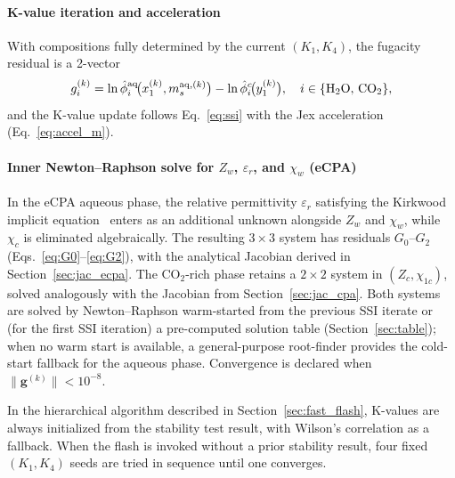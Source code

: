 \documentclass[preprint,12pt,authoryear]{elsarticle}
\begin{document}
\paragraph{K-value iteration and acceleration}
With compositions fully determined by the current $(K_1, K_4)$, the fugacity
residual is a 2-vector
\begin{equation}
  g_i^{(k)} =
    \ln\hat{\phi}_i^{\rm aq}\!\bigl(x_1^{(k)}, m_s^{{\rm aq},(k)}\bigr)
    - \ln\hat{\phi}_i^{c}\!\bigl(y_1^{(k)}\bigr),
    \quad i \in \{\mathrm{H}_2\mathrm{O},\,\mathrm{CO}_2\},
  \label{eq:g_kv}
\end{equation}
and the K-value update follows Eq.~\eqref{eq:ssi} with the Jex acceleration
(Eq.~\eqref{eq:accel_m}).
\paragraph{Inner Newton--Raphson solve for $Z_w$, $\varepsilon_r$, and $\chi_w$ (eCPA)}
In the eCPA aqueous phase, the relative permittivity $\varepsilon_r$ satisfying
the Kirkwood implicit equation~\citep{MaribMogensen2015} enters as an additional
unknown alongside $Z_w$ and $\chi_w$, while $\chi_c$ is eliminated algebraically.
The resulting $3\times 3$ system has residuals $G_0$--$G_2$
(Eqs.~\eqref{eq:G0}--\eqref{eq:G2}), with the analytical Jacobian derived in
Section~\ref{sec:jac_ecpa}.
The CO$_2$-rich phase retains a $2\times 2$ system in $(Z_c, \chi_{1c})$,
solved analogously with the Jacobian from Section~\ref{sec:jac_cpa}.
Both systems are solved by Newton--Raphson warm-started from the previous SSI
iterate or (for the first SSI iteration) a pre-computed solution table (Section~\ref{sec:table}); when no warm start is available, a general-purpose root-finder provides
the cold-start fallback for the aqueous phase.
Convergence is declared when $\|\mathbf{g}^{(k)}\| < 10^{-8}$.

In the hierarchical algorithm described in Section~\ref{sec:fast_flash},
K-values are always initialized from the stability test result, with
Wilson's correlation as a fallback.
When the flash is invoked without a prior stability result, four fixed
$(K_1, K_4)$ seeds are tried in sequence until one converges.

\end{document}
